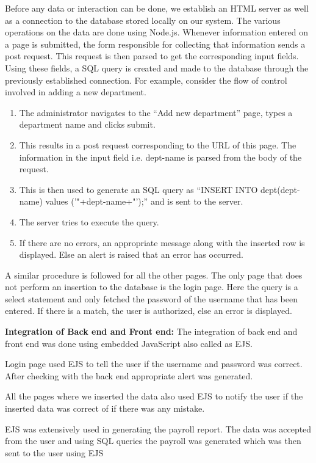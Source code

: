 \documentclass[12pt]{article}
\begin{document}
Before any data or interaction can be done, we establish an HTML server as well as a connection to the database stored locally on our system. 
\newline
\newline
The various operations on the data are done using Node.js. Whenever information entered on a page is submitted, the form responsible for collecting that information sends a post request. This request is then parsed to get the corresponding input fields. Using these fields, a SQL query is created and made to the database through the previously established connection.
\newline
\newline
For example, consider the flow of control involved in adding a new department. 
\begin{enumerate}
    \item The administrator navigates to the “Add new department” page, types a department name and clicks submit.
    \item This results in a post request corresponding to the URL of this page. The information in the input field i.e. dept-name is parsed from the body of the request.
    \item This is then used to generate an SQL query as “INSERT INTO dept(dept-name) values ('"+dept-name+"');” and is sent to the server.
    \item The server tries to execute the query.
    \item If there are no errors, an appropriate message along with the inserted row is displayed. Else an alert is raised that an error has occurred.
\end{enumerate}
A similar procedure is followed for all the other pages. The only page that does not perform an insertion to the database is the login page. Here the query is a select statement and only fetched the password of the username that has been entered. If there is a match, the user is authorized, else an error is displayed.

\newpage
\noindent
\textbf{Integration of Back end and Front end:}
\newline\newline
The integration of back end and front end was done using embedded JavaScript also called as EJS.
\item Login page used EJS to tell the user if the username and password was correct. After checking with the back end appropriate alert was generated.
\item All the pages where we inserted the data also used EJS to notify the user if the inserted data was correct of if there was any mistake.
\item EJS was extensively used in generating the payroll report. The data was accepted from the user and using SQL queries the payroll was generated which was then sent to the user using EJS 
\end{document}
